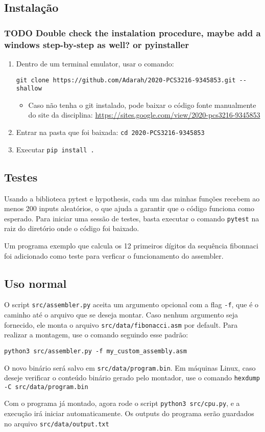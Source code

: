 \documentclass[11pt]{article}
\begin{document}
\subsection{Instalação}
\label{sec:orgd5670b3}
\subsubsection{{\bfseries\sffamily TODO} Double check the instalation procedure, maybe add a windows step-by-step as well? or pyinstaller}
\label{sec:orgc5f02f0}

\begin{enumerate}
\item Dentro de um terminal emulator, usar o comando:

\texttt{git clone https://github.com/Adarah/2020-PCS3216-9345853.git -{}-shallow}
\begin{itemize}
\item Caso não tenha o git instalado, pode baixar o código fonte manualmente do site da disciplina:
\url{https://sites.google.com/view/2020-pcs3216-9345853}
\end{itemize}
\item Entrar na pasta que foi baixada: \texttt{cd 2020-PCS3216-9345853}
\item Executar \texttt{pip install .}
\end{enumerate}
\subsection{Testes}
\label{sec:org86e163f}
Usando a biblioteca pytest e hypothesis, cada um das minhas funções recebem ao
menos 200 inputs aleatórios, o que ajuda a garantir que o código funciona como
esperado. Para iniciar uma sessão de testes, basta executar o comando \texttt{pytest}
na raiz do diretório onde o código foi baixado.

Um programa exemplo que calcula os 12 primeiros dígitos da sequência fibonnaci
foi adicionado como teste para verficar o funcionamento do assembler.
\subsection{Uso normal}
\label{sec:orgfc7d526}
O script \texttt{src/assembler.py} aceita um argumento opcional com a flag \texttt{-f}, que é
o caminho até o arquivo que se deseja montar. Caso nenhum argumento seja
fornecido, ele monta o arquivo \texttt{src/data/fibonacci.asm} por default. Para
realizar a montagem, use o comando seguindo esse padrão:

\texttt{python3 src/assembler.py -f my\_custom\_assembly.asm}

O novo binário será salvo em \texttt{src/data/program.bin}. Em máquinas Linux, caso deseje verificar o conteúdo
binário gerado pelo montador, use o comando \texttt{hexdump -C src/data/program.bin}

Com o programa já montado, agora rode o script \texttt{python3 src/cpu.py}, e a
execução irá iniciar automaticamente. Os outputs do programa serão guardados no
arquivo \texttt{src/data/output.txt}
\end{document}
